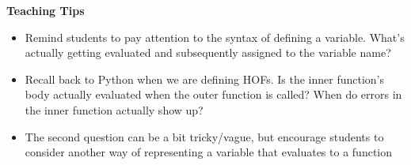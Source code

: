 \begin{blocksection}
\end{blocksection}

\begin{blocksection}
\begin{guide}
\textbf{Teaching Tips}
\begin{itemize}
	\item Remind students to pay attention to the syntax of defining a variable. What's actually getting evaluated and subsequently assigned to the variable name?
	\item Recall back to Python when we are defining HOFs. Is the inner function's body actually evaluated when the outer function is called? When do errors in the inner function actually show up?
	\item The second question can be a bit tricky/vague, but encourage students to consider another way of representing a variable that evaluates to a function
\end{itemize}
\end{guide}
\end{blocksection}